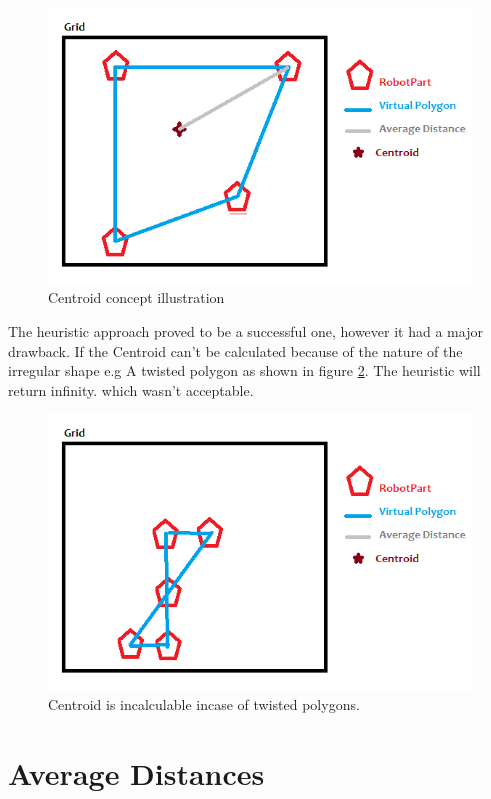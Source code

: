 \begin{figure}[H] 
   	\centering
	\includegraphics[scale=0.6]{images/Centroid} 
    \caption{Centroid concept illustration}
    \label{fig:centroid_model} 
\end{figure}

The heuristic approach proved to be a successful one, however it had a major drawback. If the Centroid can't be calculated because of the nature of the irregular shape e.g A twisted polygon as shown in figure \ref{fig:twistedcentroid}. The heuristic will return infinity. which wasn't acceptable. 

\begin{figure}[H] 
   	\centering
	\includegraphics[scale=0.6]{images/twistedcentroid} 
    \caption{Centroid is incalculable incase of twisted polygons. }
    \label{fig:twistedcentroid} 
\end{figure}


\section{Average Distances}

